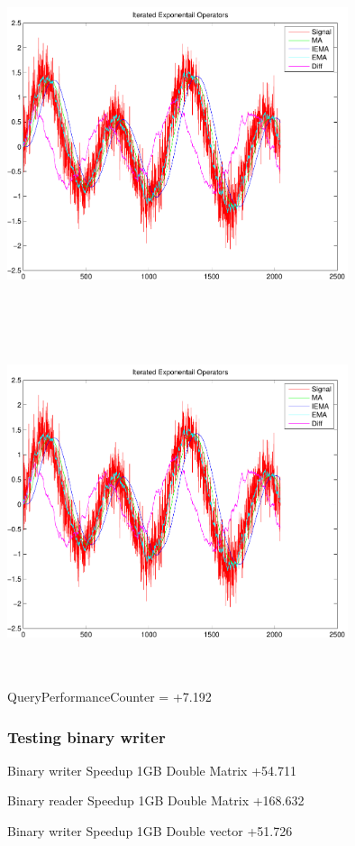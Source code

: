 \documentclass[9pt]{article}
\theoremstyle{plain}
\theoremstyle{definition}
\theoremstyle{remark}
\numberwithin{equation}{section}
\begin{document}
\includegraphics[width=10.0cm,height=10.0cm]{IteratedExponentailOperators.pdf}

\includegraphics[width=10.0cm,height=10.0cm]{IteratedExponentailOperators.pdf}

QueryPerformanceCounter  =  +7.192
\subsubsection{Testing binary writer}
Binary writer Speedup 1GB Double Matrix +54.711

Binary reader Speedup 1GB Double Matrix +168.632

Binary writer Speedup 1GB Double vector +51.726
\end{document}
